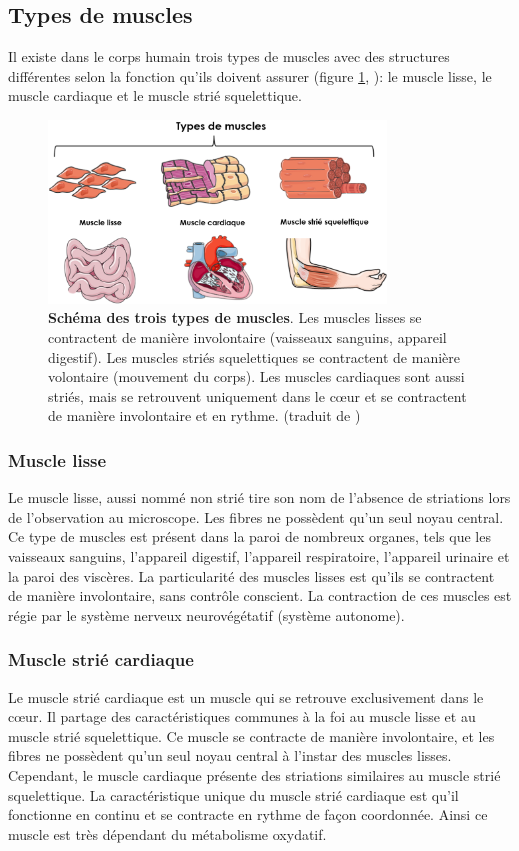 \subsection{Types de muscles}
Il existe dans le corps humain trois types de muscles avec des structures différentes selon la fonction qu'ils doivent assurer (figure \ref{fig:muscle-type}, \cite{gomez_oca_physiological_2021}): le muscle lisse, le muscle cardiaque et le muscle strié squelettique.
\begin{figure}[!ht]
 \centering
 \includegraphics[width=0.8\textwidth]{figures/muscle_type.png}
 \caption[Schéma des trois types de muscles]{\textbf{Schéma des trois types de muscles}. Les muscles lisses se contractent de manière involontaire (vaisseaux sanguins, appareil digestif). Les muscles striés squelettiques se contractent de manière volontaire (mouvement du corps). Les muscles cardiaques sont aussi striés, mais se retrouvent uniquement dans le cœur et se contractent de manière involontaire et en rythme. (traduit de \cite{gomez_oca_physiological_2021})}
 \label{fig:muscle-type}
\end{figure}
\subsubsection{Muscle lisse}
Le muscle lisse, aussi nommé non strié tire son nom de l'absence de striations lors de l'observation au microscope. Les fibres ne possèdent qu'un seul noyau central. Ce type de muscles est présent dans la paroi de nombreux organes, tels que les vaisseaux sanguins, l'appareil digestif, l'appareil respiratoire, l'appareil urinaire et la paroi des viscères. La particularité des muscles lisses est qu'ils se contractent de manière involontaire, sans contrôle conscient. La contraction de ces muscles est régie par le système nerveux neurovégétatif (système autonome).

\subsubsection{Muscle strié cardiaque}
Le muscle strié cardiaque est un muscle qui se retrouve exclusivement dans le cœur. Il partage des caractéristiques communes à la foi au muscle lisse et au muscle strié squelettique. Ce muscle se contracte de manière involontaire, et les fibres ne possèdent qu'un seul noyau central à l'instar des muscles lisses. Cependant, le muscle cardiaque présente des striations similaires au muscle strié squelettique. La caractéristique unique du muscle strié cardiaque est qu'il fonctionne en continu et se contracte en rythme de façon coordonnée. Ainsi ce muscle est très dépendant du métabolisme oxydatif.

